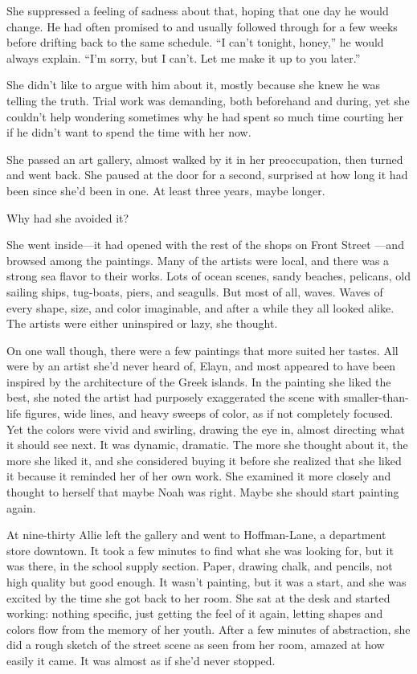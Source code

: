\documentclass[10pt, twoside, openright]{book}
\begin{document}
She suppressed a feeling of sadness about that, hoping that one day he
would change. He had often promised to and usually followed through for
a few weeks before drifting back to the same schedule. ``I can't
tonight, honey,'' he would always explain. ``I'm sorry, but I can't. Let
me make it up to you later.''

She didn't like to argue with him about it, mostly because she knew he
was telling the truth. Trial work was demanding, both beforehand and
during, yet she couldn't help wondering sometimes why he had spent so
much time courting her if he didn't want to spend the time with her now.

She passed an art gallery, almost walked by it in her preoccupation,
then turned and went back. She paused at the door for a second,
surprised at how long it had been since she'd been in one. At least
three years, maybe longer.

Why had she avoided it?

She went inside---it had opened with the rest of the shops on Front
Street ---and browsed among the paintings. Many of the artists were
local, and there was a strong sea flavor to their works. Lots of ocean
scenes, sandy beaches, pelicans, old sailing ships, tug-boats, piers,
and seagulls. But most of all, waves. Waves of every shape, size, and
color imaginable, and after a while they all looked alike. The artists
were either uninspired or lazy, she thought.

On one wall though, there were a few paintings that more suited her
tastes. All were by an artist she'd never heard of, Elayn, and most
appeared to have been inspired by the architecture of the Greek islands.
In the painting she liked the best, she noted the artist had purposely
exaggerated the scene with smaller-than-life figures, wide lines, and
heavy sweeps of color, as if not completely focused. Yet the colors were
vivid and swirling, drawing the eye in, almost directing what it should
see next. It was dynamic, dramatic. The more she thought about it, the
more she liked it, and she considered buying it before she realized that
she liked it because it reminded her of her own work. She examined it
more closely and thought to herself that maybe Noah was right. Maybe she
should start painting again.

At nine-thirty Allie left the gallery and went to Hoffman-Lane, a
department store downtown. It took a few minutes to find what she was
looking for, but it was there, in the school supply section. Paper,
drawing chalk, and pencils, not high quality but good enough. It wasn't
painting, but it was a start, and she was excited by the time she got
back to her room. She sat at the desk and started working: nothing
specific, just getting the feel of it again, letting shapes and colors
flow from the memory of her youth. After a few minutes of abstraction,
she did a rough sketch of the street scene as seen from her room, amazed
at how easily it came. It was almost as if she'd never stopped.
\end{document}
